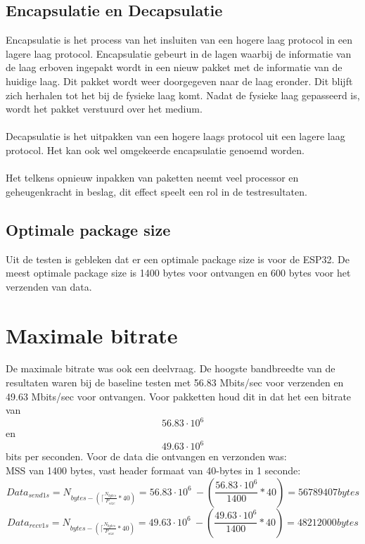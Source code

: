 \documentclass[../DCM2_Verslag.tex]{subfiles}
\begin{document}
\subsection{Encapsulatie en Decapsulatie}
Encapsulatie is het process van het insluiten van een hogere laag protocol in een lagere laag protocol. Encapsulatie gebeurt in de lagen waarbij de informatie van de laag erboven ingepakt wordt in een nieuw pakket met de informatie van de huidige laag. Dit pakket wordt weer doorgegeven naar de laag eronder. Dit blijft zich herhalen tot het bij de fysieke laag komt. Nadat de fysieke laag gepasseerd is, wordt het pakket verstuurd over het medium.\\\\
Decapsulatie is het uitpakken van een hogere laags protocol uit een lagere laag protocol. Het kan ook wel omgekeerde encapsulatie genoemd worden.\\\\
Het telkens opnieuw inpakken van paketten neemt veel processor en geheugenkracht in beslag, dit effect speelt een rol in de testresultaten.
\subsection{Optimale package size}
Uit de testen is gebleken dat er een optimale package size is voor de ESP32. De meest optimale package size is 1400 bytes voor ontvangen en 600 bytes voor het verzenden van data. 

\section{Maximale bitrate}
De maximale bitrate was ook een deelvraag. De hoogste bandbreedte van de resultaten waren bij de baseline testen met 56.83 Mbits/sec voor verzenden en 49.63 Mbits/sec voor ontvangen. Voor pakketten houd dit in dat het een bitrate van \[ 56.83 \cdot 10^{6}\] en \[49.63 \cdot 10^{6} \] bits per seconden. Voor de data die ontvangen en verzonden was: \\MSS van 1400 bytes, vast header formaat van 40-bytes in 1 seconde:\\
\[Data_{send1s} = N_{bytes -(\lceil{\frac{N_{bytes}}{P_{size}}} * 40)} =   56.83 \cdot 10^{6}\ - (\frac{ 56.83 \cdot 10^{6}}{1400}*40) = 56789407 bytes\]
\[Data_{recv1s} = N_{bytes -(\lceil{\frac{N_{bytes}}{P_{size}}} * 40)} =   49.63 \cdot 10^{6}\ - (\frac{ 49.63 \cdot 10^{6}}{1400}*40) = 48212000 bytes\]
\end{document}
